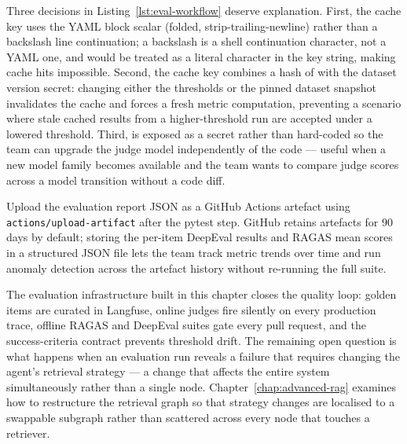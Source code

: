 Three decisions in Listing~\ref{lst:eval-workflow} deserve explanation.
First, the cache key uses the YAML \code{>-} block scalar (folded,
strip-trailing-newline) rather than a backslash line continuation; a
backslash is a shell continuation character, not a YAML one, and would be
treated as a literal character in the key string, making cache hits
impossible.  Second, the cache key combines a hash of
 with the dataset version secret: changing either
the thresholds or the pinned dataset snapshot invalidates the cache and
forces a fresh metric computation, preventing a scenario where stale cached
results from a higher-threshold run are accepted under a lowered threshold.
Third,  is exposed as a secret rather than
hard-coded so the team can upgrade the judge model independently of the
code --- useful when a new model family becomes available and the team wants
to compare judge scores across a model transition without a code diff.

\begin{tipbox}
Upload the evaluation report JSON as a GitHub Actions artefact using
\texttt{actions/upload-artifact} after the pytest step.  GitHub retains
artefacts for 90 days by default; storing the per-item DeepEval results and
RAGAS mean scores in a structured JSON file lets the team track metric
trends over time and run anomaly detection across the artefact history
without re-running the full suite.
\end{tipbox}

The evaluation infrastructure built in this chapter closes the quality loop:
golden items are curated in Langfuse, online judges fire silently on every
production trace, offline RAGAS and DeepEval suites gate every pull request,
and the success-criteria contract prevents threshold drift.  The remaining
open question is what happens when an evaluation run reveals a failure that
requires changing the agent's retrieval strategy --- a change that affects
the entire system simultaneously rather than a single node.
Chapter~\ref{chap:advanced-rag} examines how to restructure the retrieval
graph so that strategy changes are localised to a swappable subgraph rather
than scattered across every node that touches a retriever.
